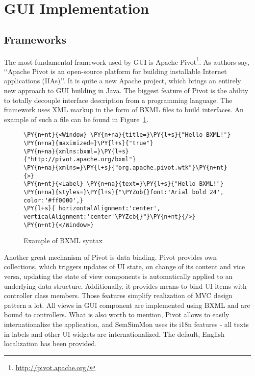 \section{GUI Implementation}
\subsection{Frameworks}

The most fundamental framework used by GUI is Apache Pivot\footnote{\url{http://pivot.apache.org/}}. As authors say, \lq\lq{}Apache Pivot is an open-source platform for building installable Internet applications (IIAs)\rq\rq{}. It is quite a new Apache project, which brings an entirely new approach to GUI building in Java. The biggest feature of Pivot is the ability to totally decouple interface description from a programming language. The framework uses XML markup in the form of BXML files to build interfaces. An example of such a file can be found in Figure~\ref{fig:bxml_example}.

\begin{figure}[ht]
\centering
\begin{Verbatim}[commandchars=\\\{\},frame=single,framerule=0.2pt] 
\PY{n+nt}{<Window} \PY{n+na}{title=}\PY{l+s}{"Hello BXML!"} \PY{n+na}{maximized=}\PY{l+s}{"true"} 
\PY{n+na}{xmlns:bxml=}\PY{l+s}{"http://pivot.apache.org/bxml"} 
\PY{n+na}{xmlns=}\PY{l+s}{"org.apache.pivot.wtk"}\PY{n+nt}{>} 
\PY{n+nt}{<Label} \PY{n+na}{text=}\PY{l+s}{"Hello BXML!"} 
\PY{n+na}{styles=}\PY{l+s}{"\PYZob{}font:'Arial bold 24', color:'#ff0000',} 
\PY{l+s}{ horizontalAlignment:'center', verticalAlignment:'center'\PYZcb{}"}\PY{n+nt}{/>} 
\PY{n+nt}{</Window>} 
\end{Verbatim} 
\caption{Example of BXML syntax}
\label{fig:bxml_example}
\end{figure}

Another great mechanism of Pivot is data binding. Pivot provides own collections, which triggers updates of UI state, on change of its content and vice versa, updating the state of view components is automatically applied to an underlying data structure. Additionally, it provides means to bind UI items with controller class members. Those features simplify realization of MVC design pattern a lot. All views in GUI component are implemented using BXML and are bound to controllers. What is also worth to mention, Pivot allows to easily internationalize the application, and SemSimMon uses its i18n features - all texts in labels and other UI widgets are internationalized. The default, English localization has been provided.


